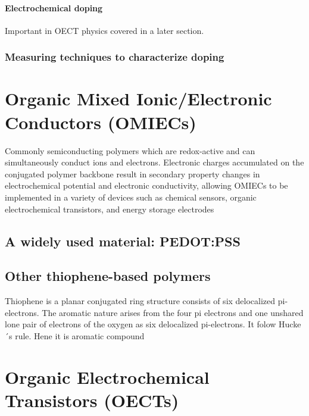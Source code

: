 \paragraph{Electrochemical doping}
Important in OECT physics covered in a later section.

\subsubsection{Measuring techniques to characterize doping}

\section{Organic Mixed Ionic/Electronic Conductors (OMIECs)}

Commonly semiconducting polymers which are redox-active and can simultaneously conduct ions and electrons. Electronic charges accumulated on the conjugated polymer backbone result in secondary property changes in electrochemical potential and electronic conductivity, allowing OMIECs to be implemented in a variety of devices such as chemical sensors, organic electrochemical transistors, and energy storage electrodes \cite{tan_organic_2022}

\subsection{A widely used material: PEDOT:PSS}

\subsection{Other thiophene-based polymers}
Thiophene is a planar conjugated ring structure consists of six delocalized pi-electrons. The aromatic nature arises from the four pi electrons and one unshared lone pair of electrons of the oxygen as six delocalized pi-electrons. It folow Hucke´s rule. Hene it is aromatic compound


\section{Organic Electrochemical Transistors (OECTs)}

